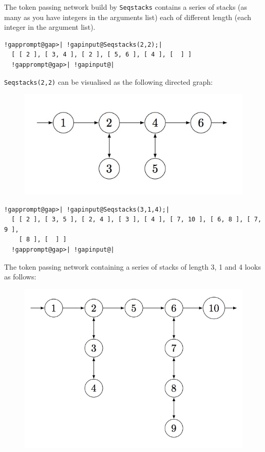 \documentclass[a4paper,11pt]{report}
\begin{document}
{{{ The token passing network build by \texttt{Seqstacks} contains a series of stacks (as many as you have integers in the arguments
list) each of different length (each integer in the argument list). 
\begin{Verbatim}[commandchars=!@|,fontsize=\small,frame=single,label=Example]
  !gapprompt@gap>| !gapinput@Seqstacks(2,2);|
  [ [ 2 ], [ 3, 4 ], [ 2 ], [ 5, 6 ], [ 4 ], [  ] ]
  !gapprompt@gap>| !gapinput@|
\end{Verbatim}
  \texttt{Seqstacks(2,2)} can be visualised as the following directed graph: \begin{figure}[H]
\begin{center} \leavevmode \includegraphics[scale=0.75]{img/ss22.jpg}
\end{center} \end{figure}   
\begin{Verbatim}[commandchars=!@|,fontsize=\small,frame=single,label=Example]
  !gapprompt@gap>| !gapinput@Seqstacks(3,1,4);|
  [ [ 2 ], [ 3, 5 ], [ 2, 4 ], [ 3 ], [ 4 ], [ 7, 10 ], [ 6, 8 ], [ 7, 9 ], 
    [ 8 ], [  ] ]
  !gapprompt@gap>| !gapinput@|
\end{Verbatim}
  The token passing network containing a series of stacks of length 3, 1 and 4
looks as follows: \begin{figure}[H] \begin{center} \leavevmode
\includegraphics[scale=0.75]{img/ss314.jpg} \end{center} \end{figure}   }

}}
\end{document}
